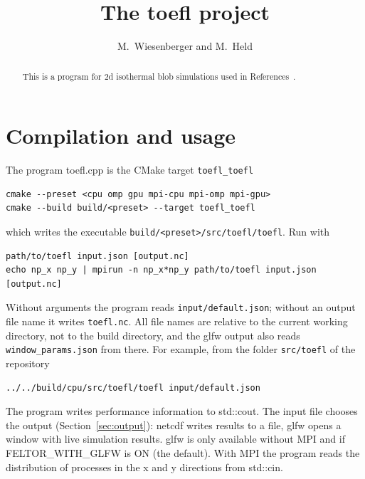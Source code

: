 


\usepackage{minted}
\renewcommand{\ne}{\ensuremath{{n_e} }}
\renewcommand{\ni}{\ensuremath{{N_i} }}



\title{The toefl project}
\author{ M.~Wiesenberger and M.~Held}
\maketitle

\begin{abstract}
  This is a program for 2d isothermal blob simulations used in References~\cite{Wiesenberger2014,Kube2016,Wiesenberger2017a}.
\end{abstract}
\tableofcontents

\section{Compilation and usage}
The program toefl.cpp is the CMake target \texttt{toefl\_toefl}
\begin{verbatim}
cmake --preset <cpu omp gpu mpi-cpu mpi-omp mpi-gpu>
cmake --build build/<preset> --target toefl_toefl
\end{verbatim}
which writes the executable \texttt{build/<preset>/src/toefl/toefl}.
Run with
\begin{verbatim}
path/to/toefl input.json [output.nc]
echo np_x np_y | mpirun -n np_x*np_y path/to/toefl input.json [output.nc]
\end{verbatim}
Without arguments the program reads \texttt{input/default.json}; without an
output file name it writes \texttt{toefl.nc}.
All file names are relative to the current working directory, not to the
build directory, and the glfw output also reads \texttt{window\_params.json}
from there. For example, from the folder \texttt{src/toefl} of the
repository
\begin{verbatim}
../../build/cpu/src/toefl/toefl input/default.json
\end{verbatim}
The program writes performance information to std::cout.
The input file chooses the output (Section~\ref{sec:output}): netcdf writes
results to a file, glfw opens a window with live simulation results. glfw is
only available without MPI and if FELTOR\_WITH\_GLFW is ON (the default).
With MPI the program reads the distribution of processes in the x and y
directions from std::cin.

